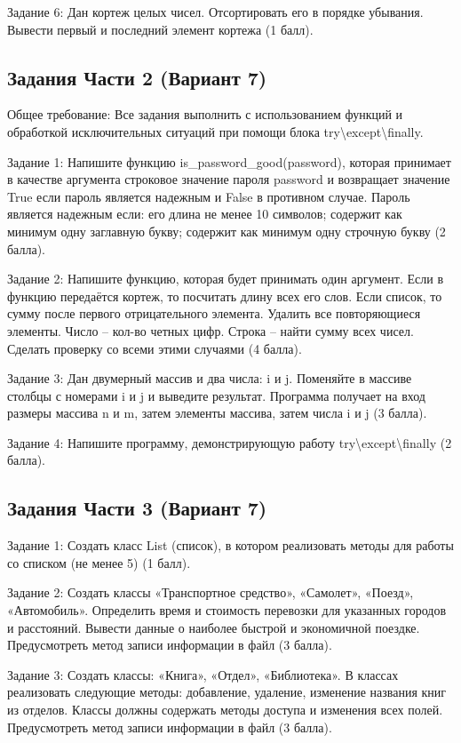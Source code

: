 \documentclass[14pt,a4paper]{extarticle}
\begin{document}
Задание 6: Дан кортеж целых чисел. Отсортировать его в порядке убывания. Вывести первый и последний элемент кортежа (1 балл).

\subsection{Задания Части 2 (Вариант 7)}

Общее требование: Все задания выполнить с использованием функций и обработкой исключительных ситуаций при помощи блока try\textbackslash{}except\textbackslash{}finally.

Задание 1: Напишите функцию is\_password\_good(password), которая принимает в качестве аргумента строковое значение пароля password и возвращает значение True если пароль является надежным и False в противном случае. Пароль является надежным если: его длина не менее 10 символов; содержит как минимум одну заглавную букву; содержит как минимум одну строчную букву (2 балла).

Задание 2: Напишите функцию, которая будет принимать один аргумент. Если в функцию передаётся кортеж, то посчитать длину всех его слов. Если список, то сумму после первого отрицательного элемента. Удалить все повторяющиеся элементы. Число -- кол-во четных цифр. Строка -- найти сумму всех чисел. Сделать проверку со всеми этими случаями (4 балла).

Задание 3: Дан двумерный массив и два числа: i и j. Поменяйте в массиве столбцы с номерами i и j и выведите результат. Программа получает на вход размеры массива n и m, затем элементы массива, затем числа i и j (3 балла).

Задание 4: Напишите программу, демонстрирующую работу try\textbackslash{}except\textbackslash{}finally (2 балла).

\subsection{Задания Части 3 (Вариант 7)}

Задание 1: Создать класс List (список), в котором реализовать методы для работы со списком (не менее 5) (1 балл).

Задание 2: Создать классы «Транспортное средство», «Самолет», «Поезд», «Автомобиль». Определить время и стоимость перевозки для указанных городов и расстояний. Вывести данные о наиболее быстрой и экономичной поездке. Предусмотреть метод записи информации в файл (3 балла).

Задание 3: Создать классы: «Книга», «Отдел», «Библиотека». В классах реализовать следующие методы: добавление, удаление, изменение названия книг из отделов. Классы должны содержать методы доступа и изменения всех полей. Предусмотреть метод записи информации в файл (3 балла).
\end{document}
